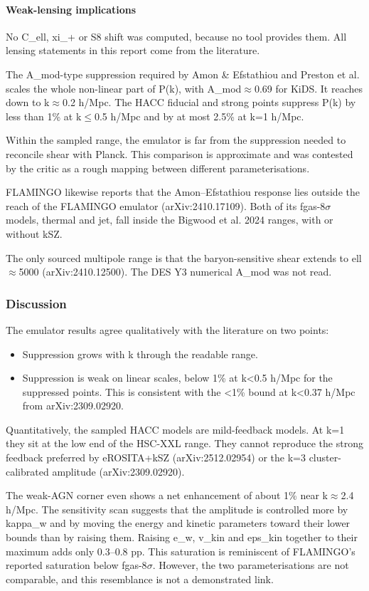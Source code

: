 \documentclass[11pt,a4paper]{article}
\begin{document}
\paragraph{Weak-lensing implications}
No C\_ell, xi\_+ or S8 shift was computed, because no tool provides them. All lensing statements in this report come from the literature.

The A\_mod-type suppression required by Amon \& Efstathiou and Preston et al. scales the whole non-linear part of P(k), with A\_mod$\approx$0.69 for KiDS. It reaches down to k$\approx$0.2 h/Mpc. The HACC fiducial and strong points suppress P(k) by less than 1\% at k$\leq$0.5 h/Mpc and by at most 2.5\% at k=1 h/Mpc.

Within the sampled range, the emulator is far from the suppression needed to reconcile shear with Planck. This comparison is approximate and was contested by the critic as a rough mapping between different parameterisations.

FLAMINGO likewise reports that the Amon--Efstathiou response lies outside the reach of the FLAMINGO emulator (arXiv:2410.17109). Both of its fgas-8$\sigma$ models, thermal and jet, fall inside the Bigwood et al. 2024 ranges, with or without kSZ.

The only sourced multipole range is that the baryon-sensitive shear extends to ell$\approx$5000 (arXiv:2410.12500). The DES Y3 numerical A\_mod was not read.

\subsubsection*{Discussion}
The emulator results agree qualitatively with the literature on two points:

\begin{itemize}
  \item Suppression grows with k through the readable range.
  \item Suppression is weak on linear scales, below 1\% at k\textless{}0.5 h/Mpc for the suppressed points. This is consistent with the \textless{}1\% bound at k\textless{}0.37 h/Mpc from arXiv:2309.02920.
\end{itemize}
Quantitatively, the sampled HACC models are mild-feedback models. At k=1 they sit at the low end of the HSC-XXL range. They cannot reproduce the strong feedback preferred by eROSITA+kSZ (arXiv:2512.02954) or the k=3 cluster-calibrated amplitude (arXiv:2309.02920).

The weak-AGN corner even shows a net enhancement of about 1\% near k$\approx$2.4 h/Mpc. The sensitivity scan suggests that the amplitude is controlled more by kappa\_w and by moving the energy and kinetic parameters toward their lower bounds than by raising them. Raising e\_w, v\_kin and eps\_kin together to their maximum adds only 0.3--0.8 pp. This saturation is reminiscent of FLAMINGO's reported saturation below fgas-8$\sigma$. However, the two parameterisations are not comparable, and this resemblance is not a demonstrated link.
\end{document}
